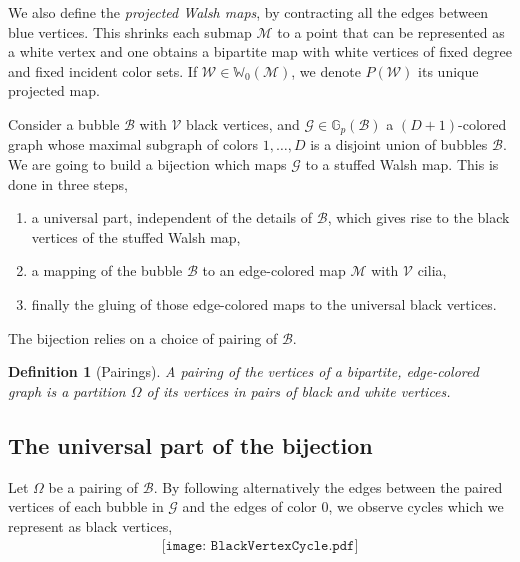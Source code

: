 \documentclass[aps,prd,10pt,notitlepage,nofootinbib,superscriptaddress,showkeys,showpacs]{revtex4-1}
\newtheorem{definition}{Definition}
\begin{document}
We also define the \emph{projected Walsh maps}, by contracting all the edges between blue vertices. This shrinks each submap ${\mathcal{M}}$ to a point that can be represented as a white vertex and one obtains a bipartite map with white vertices of fixed degree and fixed incident color sets. If ${\mathcal{W}}\in{\mathbb{W}}_0({\mathcal{M}})$, we denote $P({\mathcal{W}})$ its unique projected map.

Consider a bubble ${\mathcal{B}}$ with ${\mathcal{V}}$ black vertices, and ${\mathcal{G}}\in{\mathbb{G}}_p({\mathcal{B}})$ a $(D+1)$-colored graph whose maximal subgraph of colors $1, \dotsc, D$ is a disjoint union of bubbles ${\mathcal{B}}$. We are going to build a bijection which maps ${\mathcal{G}}$ to a stuffed Walsh map. This is done in three steps,
\begin{enumerate}
\item a universal part, independent of the details of ${\mathcal{B}}$, which gives rise to the black vertices of the stuffed Walsh map,
\item a mapping of the bubble ${\mathcal{B}}$ to an edge-colored map ${\mathcal{M}}$ with ${\mathcal{V}}$ cilia,
\item finally the gluing of those edge-colored maps to the universal black vertices.
\end{enumerate}

The bijection relies on a choice of pairing of ${\mathcal{B}}$.
\begin{definition}[Pairings] \label{def:Pairing}
A \emph{pairing} of the vertices of a bipartite, edge-colored graph is a partition $\Omega$ of its vertices in pairs of black and white vertices.
\end{definition}

\subsection{The universal part of the bijection} \label{sec:BlackVertex}

Let $\Omega$ be a pairing of ${\mathcal{B}}$. By following alternatively the edges between the paired vertices of each bubble in ${\mathcal{G}}$ and the edges of color 0, we observe cycles which we represent as black vertices,
\begin{equation}
\begin{array}{c}\texttt{[image: BlackVertexCycle.pdf]}\end{array}
\end{equation}
\end{document}
